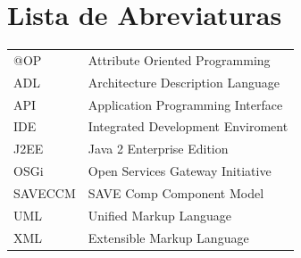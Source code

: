 \tableofcontents    %

\chapter{Lista de Abreviaturas}
\begin{tabular}{ll}
@OP & Attribute Oriented Programming \\
ADL & Architecture Description Language \\
API & Application Programming Interface \\
IDE & Integrated Development Enviroment \\
J2EE & Java 2 Enterprise Edition \\
OSGi & Open Services Gateway Initiative \\
SAVECCM & SAVE Comp Component Model \\
UML & Unified Markup Language \\
XML & Extensible Markup Language \\



		 
   
\end{tabular}



\listoffigures


